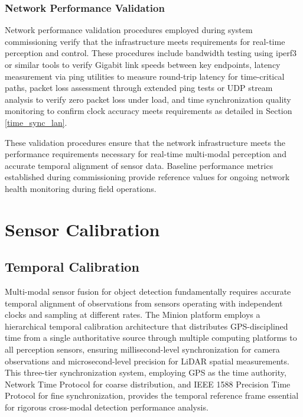 \documentclass{erauthesis}
\begin{document}
\subsubsection{Network Performance Validation}

Network performance validation procedures employed during system commissioning verify that the infrastructure meets requirements for real-time perception and control. These procedures include bandwidth testing using iperf3 or similar tools to verify Gigabit link speeds between key endpoints, latency measurement via ping utilities to measure round-trip latency for time-critical paths, packet loss assessment through extended ping tests or UDP stream analysis to verify zero packet loss under load, and time synchronization quality monitoring to confirm clock accuracy meets requirements as detailed in Section \ref{time_sync_lan}.

These validation procedures ensure that the network infrastructure meets the performance requirements necessary for real-time multi-modal perception and accurate temporal alignment of sensor data. Baseline performance metrics established during commissioning provide reference values for ongoing network health monitoring during field operations.

\section{Sensor Calibration} \label{sec:calibration}


\subsection{Temporal Calibration}\label{time_sync}

Multi-modal sensor fusion for object detection fundamentally requires accurate temporal alignment of observations from sensors operating with independent clocks and sampling at different rates.
The Minion platform employs a hierarchical temporal calibration architecture that distributes GPS-disciplined time from a single authoritative source through multiple computing platforms to all perception sensors, ensuring millisecond-level synchronization for camera observations and microsecond-level precision for LiDAR spatial measurements.
This three-tier synchronization system, employing GPS as the time authority, Network Time Protocol for coarse distribution, and IEEE 1588 Precision Time Protocol for fine synchronization, provides the temporal reference frame essential for rigorous cross-modal detection performance analysis.
\end{document}
